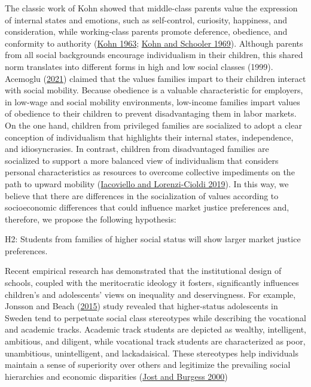 \documentclass[
  letterpaper,
  DIV=11,
  numbers=noendperiod]{scrartcl}
\begin{document}
The classic work of Kohn showed that middle-class parents value the
expression of internal states and emotions, such as self-control,
curiosity, happiness, and consideration, while working-class parents
promote deference, obedience, and conformity to authority
(\protect\hyperlink{ref-kohn_social_1963}{Kohn 1963};
\protect\hyperlink{ref-kohn_class_1969}{Kohn and Schooler 1969}).
Although parents from all social backgrounds encourage individualism in
their children, this shared norm translates into different forms in high
and low social classes (1999). Acemoglu
(\protect\hyperlink{ref-acemoglu_obedience_2021}{2021}) claimed that the
values families impart to their children interact with social mobility.
Because obedience is a valuable characteristic for employers, in
low-wage and social mobility environments, low-income families impart
values of obedience to their children to prevent disadvantaging them in
labor markets. On the one hand, children from privileged families are
socialized to adopt a clear conception of individualism that highlights
their internal states, independence, and idiosyncrasies. In contrast,
children from disadvantaged families are socialized to support a more
balanced view of individualism that considers personal characteristics
as resources to overcome collective impediments on the path to upward
mobility
(\protect\hyperlink{ref-iacoviello_collectivism_2019}{Iacoviello and
Lorenzi-Cioldi 2019}). In this way, we believe that there are
differences in the socialization of values according to socioeconomic
differences that could influence market justice preferences and,
therefore, we propose the following hypothesis:

H2: Students from families of higher social status will show larger
market justice preferences.

Recent empirical research has demonstrated that the institutional design
of schools, coupled with the meritocratic ideology it fosters,
significantly influences children's and adolescents' views on inequality
and deservingness. For example, Jonsson and Beach
(\protect\hyperlink{ref-jonsson_institutional_2015}{2015}) study
revealed that higher-status adolescents in Sweden tend to perpetuate
social class stereotypes while describing the vocational and academic
tracks. Academic track students are depicted as wealthy, intelligent,
ambitious, and diligent, while vocational track students are
characterized as poor, unambitious, unintelligent, and lackadaisical.
These stereotypes help individuals maintain a sense of superiority over
others and legitimize the prevailing social hierarchies and economic
disparities (\protect\hyperlink{ref-jost_attitudinal_2000}{Jost and
Burgess 2000})
\end{document}
